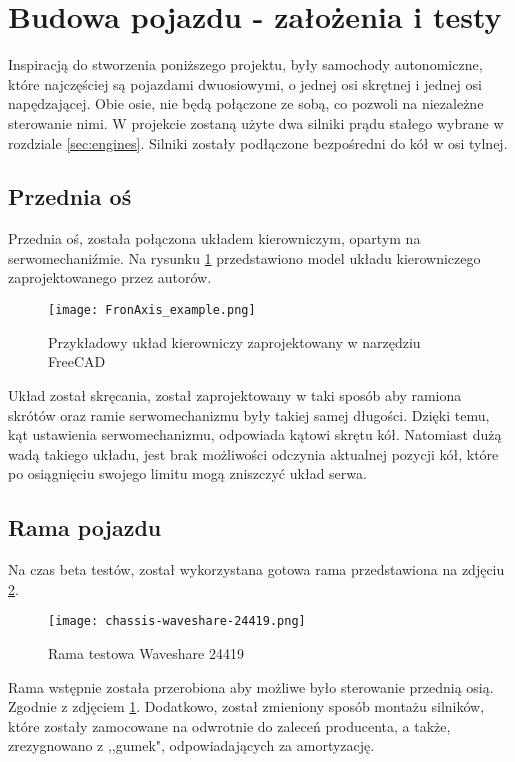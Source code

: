 \section{Budowa pojazdu - założenia i testy}
    Inspiracją do stworzenia poniższego projektu, były samochody autonomiczne, które najczęściej są pojazdami dwuosiowymi, o jednej osi skrętnej i jednej osi napędzającej.
    Obie osie, nie będą połączone ze sobą, co pozwoli na niezależne sterowanie nimi.
    W projekcie zostaną użyte dwa silniki prądu stałego wybrane w rozdziale \ref{sec:engines}.
    Silniki zostały podłączone bezpośredni do kół w osi tylnej.
    \subsection{Przednia oś}
        Przednia oś, została połączona układem kierowniczym, opartym na serwomechaniźmie.
        Na rysunku \ref{fig:frontAxis_model} przedstawiono model układu kierowniczego zaprojektowanego przez autorów.

        \begin{figure}[!ht]
            \centering
            \texttt{[image: FronAxis\_example.png]}
            \caption{Przykładowy układ kierowniczy zaprojektowany w narzędziu FreeCAD}
            \label{fig:frontAxis_model}
        \end{figure}
        Układ został skręcania, został zaprojektowany w taki sposób aby ramiona skrótów oraz ramie serwomechanizmu były takiej samej długości.
        Dzięki temu, kąt ustawienia serwomechanizmu, odpowiada kątowi skrętu kół.
        Natomiast dużą wadą takiego układu, jest brak możliwości odczynia aktualnej pozycji kół, które po osiągnięciu swojego limitu mogą zniszczyć układ serwa.

    \subsection{Rama pojazdu}
    Na czas beta testów, został wykorzystana gotowa rama przedstawiona na zdjęciu \ref{fig:test_chassis}.
    \begin{figure}[!ht]
        \centering
        \texttt{[image: chassis-waveshare-24419.png]}
        \caption{Rama testowa Waveshare 24419}
        \label{fig:test_chassis}
    \end{figure}

    Rama wstępnie została przerobiona aby możliwe było sterowanie przednią osią. Zgodnie z zdjęciem \ref{fig:frontAxis_model}.
    Dodatkowo, został zmieniony sposób montażu silników, które zostały zamocowane na odwrotnie do zaleceń producenta, a także, zrezygnowano z ,,gumek", odpowiadających za amortyzację.


